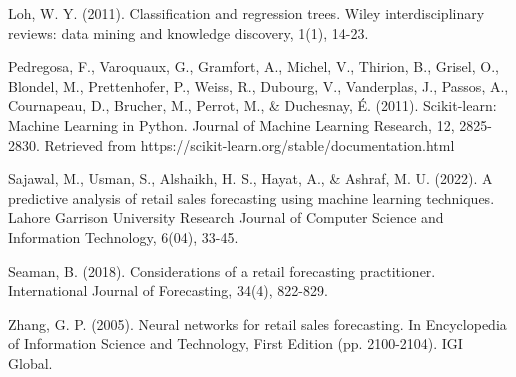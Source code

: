 \documentclass[12pt]{report}
\begin{document}
Loh, W. Y. (2011). Classification and regression trees. Wiley interdisciplinary reviews: data mining and knowledge discovery, 1(1), 14-23.

Pedregosa, F., Varoquaux, G., Gramfort, A., Michel, V., Thirion, B., Grisel, O., Blondel, M., Prettenhofer, P., Weiss, R., Dubourg, V., Vanderplas, J., Passos, A., Cournapeau, D., Brucher, M., Perrot, M., \& Duchesnay, É. (2011). Scikit-learn: Machine Learning in Python. Journal of Machine Learning Research, 12, 2825-2830. Retrieved from https://scikit-learn.org/stable/documentation.html

Sajawal, M., Usman, S., Alshaikh, H. S., Hayat, A., \& Ashraf, M. U. (2022). A predictive analysis of retail sales forecasting using machine learning techniques. Lahore Garrison University Research Journal of Computer Science and Information Technology, 6(04), 33-45.

Seaman, B. (2018). Considerations of a retail forecasting practitioner. International Journal of Forecasting, 34(4), 822-829.

Zhang, G. P. (2005). Neural networks for retail sales forecasting. In Encyclopedia of Information Science and Technology, First Edition (pp. 2100-2104). IGI Global.
\end{document}
